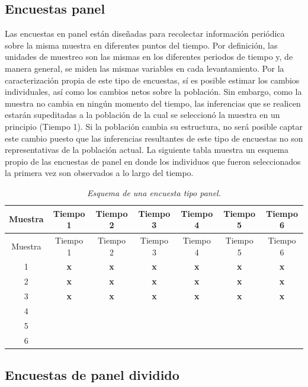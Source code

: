 \documentclass[
  10pt,
  spanish,
]{book}
\begin{document}
\hypertarget{encuestas-panel}{%
\subsection{Encuestas panel}\label{encuestas-panel}}

Las encuestas en panel están diseñadas para recolectar información periódica sobre la misma muestra en diferentes puntos del tiempo. Por definición, las unidades de muestreo son las mismas en los diferentes periodos de tiempo y, de manera general, se miden las mismas variables en cada levantamiento. Por la caracterización propia de este tipo de encuestas, sí es posible estimar los cambios individuales, así como los cambios netos sobre la población. Sin embargo, como la muestra no cambia en ningún momento del tiempo, las inferencias que se realicen estarán supeditadas a la población de la cual se seleccionó la muestra en un principio (Tiempo 1). Si la población cambia su estructura, no será posible captar este cambio puesto que las inferencias resultantes de este tipo de encuestas no son representativas de la población actual. La siguiente tabla muestra un esquema propio de las encuestas de panel en donde los individuos que fueron seleccionados la primera vez son observados a lo largo del tiempo.

\begin{longtable}[]{@{}ccccccc@{}}
\caption{\emph{Esquema de una encuesta tipo panel.}}\tabularnewline
\toprule
Muestra & Tiempo 1 & Tiempo 2 & Tiempo 3 & Tiempo 4 & Tiempo 5 & Tiempo 6 \\
\midrule
\endfirsthead
\toprule
Muestra & Tiempo 1 & Tiempo 2 & Tiempo 3 & Tiempo 4 & Tiempo 5 & Tiempo 6 \\
\midrule
\endhead
1 & \textbf{x} & \textbf{x} & \textbf{x} & \textbf{x} & \textbf{x} & \textbf{x} \\
2 & \textbf{x} & \textbf{x} & \textbf{x} & \textbf{x} & \textbf{x} & \textbf{x} \\
3 & \textbf{x} & \textbf{x} & \textbf{x} & \textbf{x} & \textbf{x} & \textbf{x} \\
4 & & & & & & \\
5 & & & & & & \\
6 & & & & & & \\
\bottomrule
\end{longtable}

\hypertarget{encuestas-de-panel-dividido}{%
\subsection{Encuestas de panel dividido}\label{encuestas-de-panel-dividido}}
\end{document}
